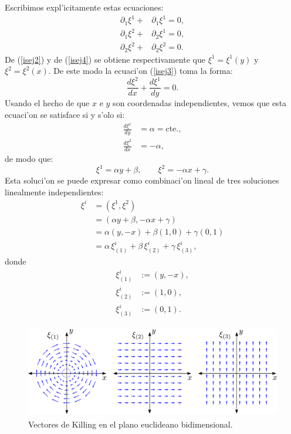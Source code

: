 Escribimos expl'icitamente estas ecuaciones:%
\begin{align}
\partial_1\xi^1+ & \partial_1\xi^1= 0, \label{isej2}\\
\partial_1\xi^2+ & \partial_2\xi^1= 0, \label{isej3} \\
\partial_2\xi^2+ & \partial_2\xi^2= 0.  \label{isej4}
\end{align}
De (\ref{isej2}) y de (\ref{isej4}) se obtiene respectivamente que $\xi
^1=\xi^1(y)$ y $\xi^2=\xi^2(x)$. De este modo la ecuaci'on (\ref{isej3}) toma la forma:
\begin{equation}
\frac{d\xi^2}{dx}+\frac{d\xi^1}{dy}=0.  \label{isej5}%
\end{equation}
Usando el hecho de que $x$ e $y$ son coordenadas independientes, vemos que
esta ecuaci'on se satisface si y s'olo si:
\begin{align}
\frac{d\xi^1}{dy}  &  =\alpha=\text{cte.},\label{isej6}\\
\frac{d\xi^2}{dx}  &  =-\alpha, \nonumber
\end{align}
de modo que:
\begin{equation}
\xi^1 =\alpha y+\beta, \qquad
\xi^2 =-\alpha x+\gamma. \label{isej7}
\end{equation}
Esta soluci'on se puede expresar como combinaci'on lineal de tres
soluciones linealmente independientes:
\begin{align}
\xi^i  &  =\left(  \xi^1,\xi^2\right)  \\
& =\left(  \alpha y+\beta,-\alpha x+\gamma\right) \\
  &  =\alpha\left(  y,-x\right)  +\beta\left(  1,0\right)
+\gamma\left(  0,1\right)  \\
 &  =\alpha\,\xi_{(1)}^i+\beta\,\xi_{(2)}^i+\gamma\,\xi_{(3)}^i, \nonumber
\end{align}
donde
\begin{align}
\xi_{(1)}^i  &  :=\left(  y,-x\right)  ,\\
\xi_{(2)}^i  &  :=\left(  1,0\right)  ,\\
\xi_{(3)}^i  &  :=\left(  0,1\right)  .
\end{align}
\begin{center}
\begin{figure}[H]
\centerline{\includegraphics[height=4cm]{fig/fig-Killing-E2.pdf}}
\caption{Vectores de Killing en el plano euclideano bidimensional.}
\label{KE2}
\end{figure}
\end{center}
